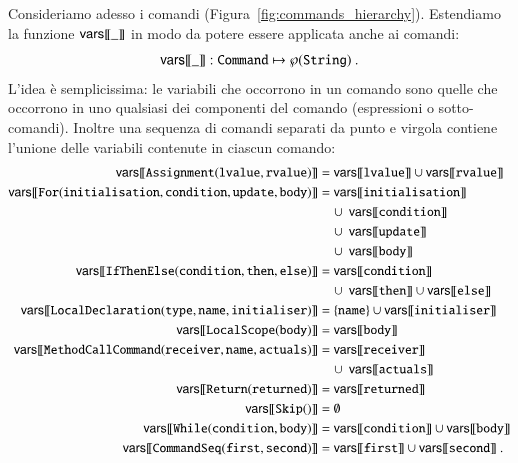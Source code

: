Consideriamo adesso i comandi (Figura~\ref{fig:commands_hierarchy}).
Estendiamo la funzione ${\mathsf{vars}[\![{\_}]\!]}$ in modo da potere essere applicata anche
ai comandi:
\[
  {\mathsf{vars}[\![{\_}]\!]}:\mathtt{Command}\mapsto\wp(\mathtt{String})~.
\]
%
L'idea \`e semplicissima: le variabili che occorrono in un comando sono
quelle che occorrono in uno qualsiasi dei componenti del comando
(espressioni o sotto-comandi). Inoltre una sequenza di comandi separati
da punto e virgola contiene l'unione delle variabili contenute in ciascun
comando:
%
\begin{align}
  \notag
  \vars{\mathtt{Assignment(lvalue,rvalue)}}
    &=\vars{\mathtt{lvalue}}\cup\vars{\mathtt{rvalue}}\\\notag
  \vars{\mathtt{For(initialisation,condition,update,body)}}
    &=\vars{\mathtt{initialisation}}\\\notag
      &\quad\cup\ \vars{\mathtt{condition}}\\\notag
      &\quad\cup\ \vars{\mathtt{update}}\\\notag
      &\quad\cup\ \vars{\mathtt{body}}\\
  \label{eq:vars_ifthenelse}
  \vars{\mathtt{IfThenElse(condition,then,else)}}
    &=\vars{\mathtt{condition}}\\\notag
      &\quad\cup\ \vars{\mathtt{then}}\cup
      \vars{\mathtt{else}}\\\notag
  \vars{\mathtt{LocalDeclaration(type,name,initialiser)}}
    &=\{\mathtt{name}\}\cup\vars{\mathtt{initialiser}}\\\notag
  \vars{\mathtt{LocalScope(body)}}&=\vars{\mathtt{body}}\\\notag
  \vars{\mathtt{MethodCallCommand(receiver,name,actuals)}}&=
    \vars{\mathtt{receiver}}\\\notag
  &\quad\cup\ \vars{\mathtt{actuals}}\\\notag
  \vars{\mathtt{Return(returned)}}&=\vars{\mathtt{returned}}\\\notag
  \vars{\mathtt{Skip()}}&=\emptyset\\\notag
  \vars{\mathtt{While(condition,body)}}&=\vars{\mathtt{condition}}\cup
    \vars{\mathtt{body}}\\
  \label{eq:vars_sequence}
  \vars{\mathtt{CommandSeq(first,second)}}&=\vars{\mathtt{first}}\cup\vars{\mathtt{second}}~.
\end{align}

